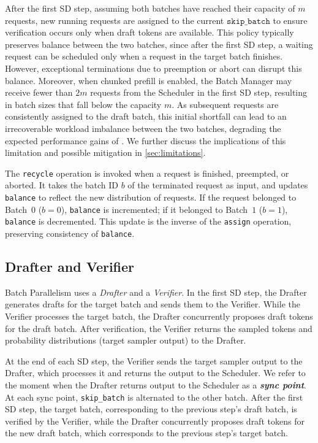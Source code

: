 After the first SD step, assuming both batches have reached their capacity of $m$ requests, new running requests are assigned to the current $\texttt{skip\_batch}$ to ensure verification occurs only when draft tokens are available. This policy typically preserves balance between the two batches, since after the first SD step, a waiting request can be scheduled only when a request in the target batch finishes. However, exceptional terminations due to preemption or abort can disrupt this balance.
Moreover, when chunked prefill is enabled, the Batch Manager may receive fewer than $2m$ requests from the Scheduler in the first SD step, resulting in batch sizes that fall below the capacity $m$. As subsequent requests are consistently assigned to the draft batch, this initial shortfall can lead to an irrecoverable workload imbalance between the two batches, degrading the expected performance gains of \alg{}. We further discuss the implications of this limitation and possible mitigation in \cref{sec:limitations}.


The \texttt{recycle} operation is invoked when a request is finished, preempted, or aborted. It takes the batch ID $b$ of the terminated request as input, and updates \texttt{balance} to reflect the new distribution of requests. If the request belonged to Batch~$0$ ($b=0$), \texttt{balance} is incremented; if it belonged to Batch~$1$ ($b=1$), \texttt{balance} is decremented. This update is the inverse of the \texttt{assign} operation, preserving consistency of \texttt{balance}.


\subsection{Drafter and Verifier}
Batch Parallelism uses a \textit{Drafter} and a \textit{Verifier}. In the first SD step, the Drafter generates drafts for the target batch and sends them to the Verifier. While the Verifier processes the target batch, the Drafter concurrently proposes draft tokens for the draft batch. After verification, the Verifier returns the sampled tokens and probability distributions (target sampler output) to the Drafter.

At the end of each SD step, the Verifier sends the target sampler output to the Drafter, which processes it and returns the output to the Scheduler. We refer to the moment when the Drafter returns output to the Scheduler as a \textbf{\emph{sync point}}. At each sync point, \texttt{skip\_batch} is alternated to the other batch.
After the first SD step, the target batch, corresponding to the previous step's draft batch, is verified by the Verifier, while the Drafter concurrently proposes draft tokens for the new draft batch, which corresponds to the previous step's target batch.


